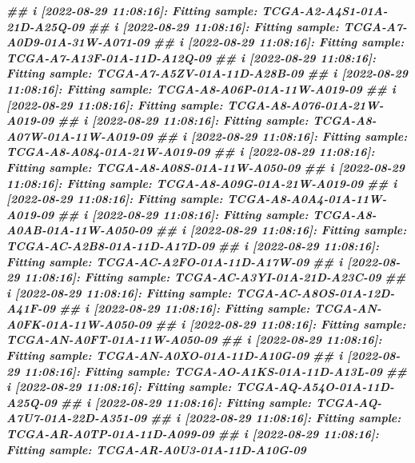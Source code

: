 \documentclass[
  12pt,
  a4paper,
  twoside]{book}
\newenvironment{Shaded}{\begin{snugshade}}{\end{snugshade}}
\newcommand{\DocumentationTok}[1]{\textcolor[rgb]{0.56,0.35,0.01}{\textbf{\textit{#1}}}}
\begin{document}
\begin{Shaded}
\begin{Highlighting}[]
\DocumentationTok{\#\# i [2022{-}08{-}29 11:08:16]: Fitting sample: TCGA{-}A2{-}A4S1{-}01A{-}21D{-}A25Q{-}09}
\DocumentationTok{\#\# i [2022{-}08{-}29 11:08:16]: Fitting sample: TCGA{-}A7{-}A0D9{-}01A{-}31W{-}A071{-}09}
\DocumentationTok{\#\# i [2022{-}08{-}29 11:08:16]: Fitting sample: TCGA{-}A7{-}A13F{-}01A{-}11D{-}A12Q{-}09}
\DocumentationTok{\#\# i [2022{-}08{-}29 11:08:16]: Fitting sample: TCGA{-}A7{-}A5ZV{-}01A{-}11D{-}A28B{-}09}
\DocumentationTok{\#\# i [2022{-}08{-}29 11:08:16]: Fitting sample: TCGA{-}A8{-}A06P{-}01A{-}11W{-}A019{-}09}
\DocumentationTok{\#\# i [2022{-}08{-}29 11:08:16]: Fitting sample: TCGA{-}A8{-}A076{-}01A{-}21W{-}A019{-}09}
\DocumentationTok{\#\# i [2022{-}08{-}29 11:08:16]: Fitting sample: TCGA{-}A8{-}A07W{-}01A{-}11W{-}A019{-}09}
\DocumentationTok{\#\# i [2022{-}08{-}29 11:08:16]: Fitting sample: TCGA{-}A8{-}A084{-}01A{-}21W{-}A019{-}09}
\DocumentationTok{\#\# i [2022{-}08{-}29 11:08:16]: Fitting sample: TCGA{-}A8{-}A08S{-}01A{-}11W{-}A050{-}09}
\DocumentationTok{\#\# i [2022{-}08{-}29 11:08:16]: Fitting sample: TCGA{-}A8{-}A09G{-}01A{-}21W{-}A019{-}09}
\DocumentationTok{\#\# i [2022{-}08{-}29 11:08:16]: Fitting sample: TCGA{-}A8{-}A0A4{-}01A{-}11W{-}A019{-}09}
\DocumentationTok{\#\# i [2022{-}08{-}29 11:08:16]: Fitting sample: TCGA{-}A8{-}A0AB{-}01A{-}11W{-}A050{-}09}
\DocumentationTok{\#\# i [2022{-}08{-}29 11:08:16]: Fitting sample: TCGA{-}AC{-}A2B8{-}01A{-}11D{-}A17D{-}09}
\DocumentationTok{\#\# i [2022{-}08{-}29 11:08:16]: Fitting sample: TCGA{-}AC{-}A2FO{-}01A{-}11D{-}A17W{-}09}
\DocumentationTok{\#\# i [2022{-}08{-}29 11:08:16]: Fitting sample: TCGA{-}AC{-}A3YI{-}01A{-}21D{-}A23C{-}09}
\DocumentationTok{\#\# i [2022{-}08{-}29 11:08:16]: Fitting sample: TCGA{-}AC{-}A8OS{-}01A{-}12D{-}A41F{-}09}
\DocumentationTok{\#\# i [2022{-}08{-}29 11:08:16]: Fitting sample: TCGA{-}AN{-}A0FK{-}01A{-}11W{-}A050{-}09}
\DocumentationTok{\#\# i [2022{-}08{-}29 11:08:16]: Fitting sample: TCGA{-}AN{-}A0FT{-}01A{-}11W{-}A050{-}09}
\DocumentationTok{\#\# i [2022{-}08{-}29 11:08:16]: Fitting sample: TCGA{-}AN{-}A0XO{-}01A{-}11D{-}A10G{-}09}
\DocumentationTok{\#\# i [2022{-}08{-}29 11:08:16]: Fitting sample: TCGA{-}AO{-}A1KS{-}01A{-}11D{-}A13L{-}09}
\DocumentationTok{\#\# i [2022{-}08{-}29 11:08:16]: Fitting sample: TCGA{-}AQ{-}A54O{-}01A{-}11D{-}A25Q{-}09}
\DocumentationTok{\#\# i [2022{-}08{-}29 11:08:16]: Fitting sample: TCGA{-}AQ{-}A7U7{-}01A{-}22D{-}A351{-}09}
\DocumentationTok{\#\# i [2022{-}08{-}29 11:08:16]: Fitting sample: TCGA{-}AR{-}A0TP{-}01A{-}11D{-}A099{-}09}
\DocumentationTok{\#\# i [2022{-}08{-}29 11:08:16]: Fitting sample: TCGA{-}AR{-}A0U3{-}01A{-}11D{-}A10G{-}09}

\end{Highlighting}
\end{Shaded}
\end{document}
